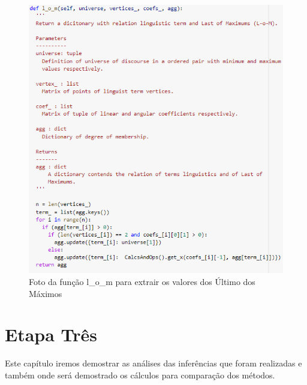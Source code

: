 \documentclass[courier]{uninove-ppgi}
\begin{document}
			 
		     \begin{figure}[ht!]
    
        	    \begin{center}
        	
        		    \includegraphics[scale=1.1]{l_o_m}
        	
        	    \end{center}
        	
        	    \caption{Foto da função l_o_m para extrair os valores dos Último dos Máximos}
        	
        	
            \end{figure}
			
			 
	\chapter{Etapa Três}
    
        \begin{resumocapitulo}
            Este capítulo iremos demostrar as análises das inferências que foram realizadas e também onde será demostrado os cálculos para comparação dos métodos. 
        \end{resumocapitulo}
		
\end{document}
